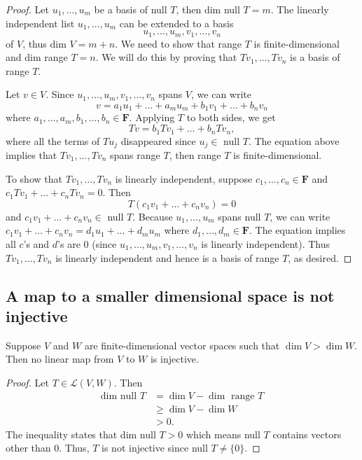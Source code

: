 \documentclass[11pt]{article}
\begin{document}
    \begin{proof}
        Let \(u_1, \dots, u_m\) be a basis of null $T$, then dim null $T = m$. The linearly independent list \(u_1, \dots, u_m\) can be extended to a basis \[u_1, \dots, u_m, v_1, \dots, v_n\] of $V$, thus dim $V = m + n$. We need to show that range $T$ is finite-dimensional and dim range $T = n$. We will do this by proving that \(Tv_1, \dots, Tv_n\) is a basis of range $T$.

        \vspace{1em}

        Let \(v \in V\). Since \(u_1, \dots, u_m, v_1, \dots, v_n\) spans $V$, we can write \[v = a_1 u_1 + \dots + a_m u_m + b_1 v_1 + \dots + b_n v_n\] where \(a_1, \dots, a_m, b_1, \dots, b_n \in \textbf{F}\). Applying $T$ to both sides, we get \[Tv = b_1 Tv_1 + \dots + b_n T v_n,\] where all the terms of \(Tu_j\) disappeared since \(u_j \in \) null $T$. The equation above implies that \(Tv_1, \dots, Tv_n\) spans range $T$, then range $T$ is finite-dimensional. 

        \vspace{1em}
        To show that \(Tv_1, \dots, Tv_n\) is linearly independent, suppose \(c_1, \dots, c_n \in \textbf{F}\) and \(c_1 Tv_1 + \dots + c_n T v_n = 0.\) Then \[T(c_1 v_1 + \dots + c_n v_n) = 0\] and \(c_1 v_1 + \dots + c_n v_n \in \) null $T$. Because \(u_1, \dots, u_m\) spans null $T$, we can write \(c_1 v_1 + \dots + c_n v_n = d_1 u_1 + \dots + d_m u_m\) where \(d_1, \dots, d_m \in \textbf{F}\). The equation implies all $c$'s and $d$'s are 0 (since \(u_1, \dots, u_m, v_1, \dots, v_n\) is linearly independent). Thus \(Tv_1, \dots, Tv_n\) is linearly independent and hence is a basis of range $T$, as desired.
    \end{proof}

    \subsection{A map to a smaller dimensional space is not injective}

    Suppose $V$ and $W$ are finite-dimensional vector spaces such that \(\dim V > \dim W\). Then no linear map from $V$ to $W$ is injective. 

    \begin{proof}
        Let \(T \in \mathcal{L}(V,W)\). Then 
        \begin{align*}
            \text{dim null } T &= \dim V - \dim \text{ range } T \\
                               &\geq \dim V - \dim W \\
                               &> 0.
        \end{align*}
        The inequality states that dim null $T > 0$ which means null $T$ contains vectors other than 0. Thus, $T$ is not injective since null $T \neq \{0\}$. 
    \end{proof}
\end{document}
